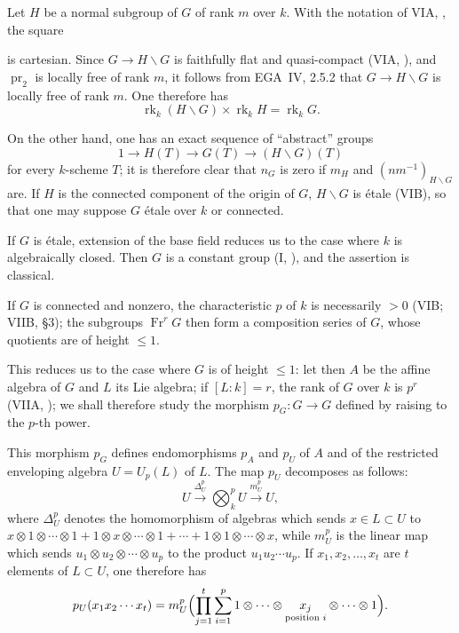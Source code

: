 Let \(H\) be a normal subgroup of \(G\) of rank \(m\) over \(k\). With the
notation of VIA, , the square
\begin{center}
  \label{sga3:VIIA:8.5-normal-subgroup-cartesian-square}
  
\end{center}
is cartesian. Since \(G\to H\backslash G\) is faithfully flat and
quasi-compact (VIA, ), and \(\operatorname{pr}_2\) is locally free of
rank \(m\), it follows from EGA~IV, 2.5.2 that \(G\to H\backslash G\) is
locally free of rank \(m\). One therefore has
\[
  \operatorname{rk}_k(H\backslash G)\times\operatorname{rk}_kH
  =\operatorname{rk}_kG.
\]

On the other hand, one has an exact sequence of ``abstract'' groups
\[
  1\longrightarrow H(T)\longrightarrow G(T)
  \longrightarrow(H\backslash G)(T)
\]
for every \(k\)-scheme \(T\); it is therefore clear that \(n_G\) is zero
if \(m_H\) and \((nm^{-1})_{H\backslash G}\) are. If \(H\) is the
connected component of the origin of \(G\), \(H\backslash G\) is \'etale
(VIB), so that one may suppose \(G\) \'etale over \(k\) or connected.

If \(G\) is \'etale, extension of the base field reduces us to
the case where \(k\) is algebraically closed. Then \(G\) is a
constant group (I, ), and the assertion is classical.

If \(G\) is connected and nonzero, the characteristic \(p\) of \(k\) is
necessarily \(>0\) (VIB; VIIB, \S3); the subgroups
\(\operatorname{Fr}^rG\) then form a composition series of \(G\), whose
quotients are of height \(\leq1\).

This reduces us to the case where \(G\) is of height \(\leq1\): let then
\(A\) be the affine algebra of \(G\) and \(L\) its Lie algebra; if
\([L:k]=r\), the rank of \(G\) over \(k\) is \(p^r\) (VIIA, ); we
shall therefore study the morphism \(p_G:G\to G\) defined by raising to
the \(p\)-th power.

This morphism \(p_G\) defines endomorphisms \(p_A\) and \(p_U\) of \(A\)
and of the restricted enveloping algebra \(U=U_p(L)\) of \(L\). The map
\(p_U\) decomposes as follows:
\[
  U\xrightarrow{\Delta_U^p}\bigotimes\nolimits_k^pU\xrightarrow{m_U^p}U,
\]
where \(\Delta_U^p\) denotes the homomorphism of algebras which sends
\(x\in L\subset U\) to
\(x\otimes1\otimes\cdots\otimes1+1\otimes x\otimes\cdots\otimes1+\cdots
+1\otimes1\otimes\cdots\otimes x\), while \(m_U^p\) is the linear map which
sends \(u_1\otimes u_2\otimes\cdots\otimes u_p\) to the product
\(u_1u_2\cdots u_p\). If \(x_1,x_2,\ldots,x_t\) are \(t\) elements of
\(L\subset U\), one therefore has
\[
  p_U(x_1x_2\cdots x_t)
  =
  m_U^p\Bigl(\prod_{j=1}^t\sum_{i=1}^p
    1\otimes\cdots\otimes
    \underset{\text{\scriptsize position \(i\)}}{x_j}
    \otimes\cdots\otimes1\Bigr).
\]

